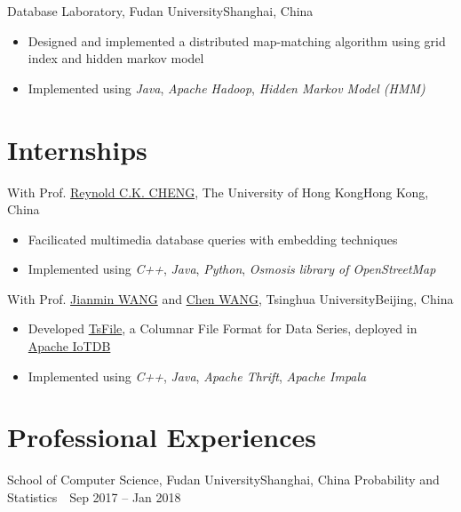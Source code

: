 \documentclass{resume}
\begin{document}
{Database Laboratory, Fudan University}{Shanghai, China}
\begin{itemize}
  \item Designed and implemented a distributed map-matching algorithm using grid index and hidden markov model
  \item Implemented using \emph{Java}, \emph{Apache Hadoop}, \emph{Hidden Markov Model (HMM)}
\end{itemize}

% 
% 

\section{Internships}

{With Prof. \href{https://i.cs.hku.hk/~ckcheng/}{\color{black} Reynold C.K. CHENG}, The University of Hong Kong}{Hong Kong, China}
\begin{itemize}
  \item Facilicated multimedia database queries with embedding techniques
  \item Implemented using \emph{C++}, \emph{Java}, \emph{Python}, \emph{Osmosis library of OpenStreetMap}
\end{itemize}

{With Prof. \href{http://www.thss.tsinghua.edu.cn/publish/soften/3131/2010/20101219100058471372347/20101219100058471372347_.html}{\color{black} Jianmin WANG} and \href{mailto:wang_chen@tsinghua.edu.cn}{\color{black} Chen WANG}, Tsinghua University}{Beijing, China}
\begin{itemize}
  \item Developed \href{https://github.com/thulab/tsfile}{\color{black} TsFile}, a Columnar File Format for Data Series, deployed in \href{http://iotdb.apache.org/}{\color{black} Apache IoTDB}
  \item Implemented using \emph{C++}, \emph{Java}, \emph{Apache Thrift}, \emph{Apache Impala}
\end{itemize}

% 
% 

\section{Professional Experiences}
{School of Computer Science, Fudan University}{Shanghai, China}
\hspace{\parindent} Probability and Statistics\ \ \hfill Sep 2017 -- Jan 2018\ \
\end{document}
